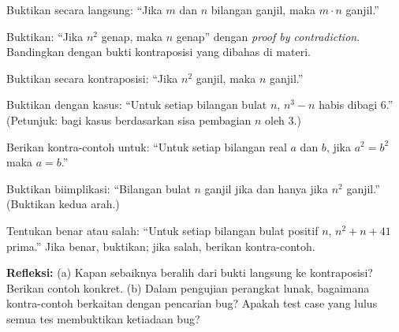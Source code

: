 \documentclass[../main]{subfiles}
\begin{document}

\begin{latihan}
  \item Buktikan secara langsung: ``Jika $m$ dan $n$ bilangan ganjil, maka $m \cdot n$ ganjil.''
  \item Buktikan: ``Jika $n^2$ genap, maka $n$ genap'' dengan \textit{proof by contradiction}. Bandingkan dengan bukti kontraposisi yang dibahas di materi.
  \item Buktikan secara kontraposisi: ``Jika $n^2$ ganjil, maka $n$ ganjil.''
  \item Buktikan dengan kasus: ``Untuk setiap bilangan bulat $n$, $n^3 - n$ habis dibagi 6.'' (Petunjuk: bagi kasus berdasarkan sisa pembagian $n$ oleh 3.)
  \item Berikan kontra-contoh untuk: ``Untuk setiap bilangan real $a$ dan $b$, jika $a^2 = b^2$ maka $a = b$.''
  \item Buktikan biimplikasi: ``Bilangan bulat $n$ ganjil jika dan hanya jika $n^2$ ganjil.'' (Buktikan kedua arah.)
  \item Tentukan benar atau salah: ``Untuk setiap bilangan bulat positif $n$, $n^2 + n + 41$ prima.'' Jika benar, buktikan; jika salah, berikan kontra-contoh.
  \item \textbf{Refleksi:} (a) Kapan sebaiknya beralih dari bukti langsung ke kontraposisi? Berikan contoh konkret. (b) Dalam pengujian perangkat lunak, bagaimana kontra-contoh berkaitan dengan pencarian bug? Apakah test case yang lulus semua tes membuktikan ketiadaan bug?
\end{latihan}

\end{document}
